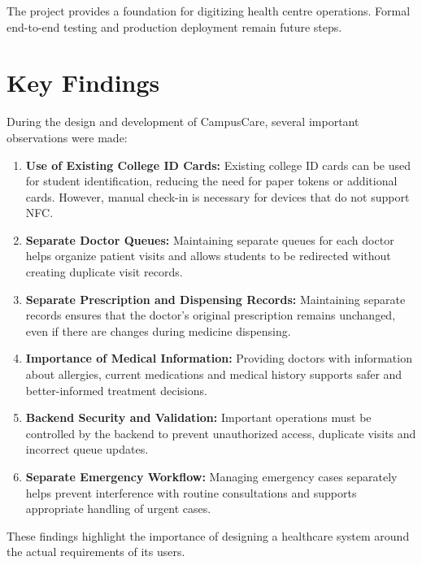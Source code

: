 \documentclass[a4paper,oneside,openany]{tietreport}
\begin{document}
The project provides a foundation for digitizing
health centre operations. Formal end-to-end testing
and production deployment remain future steps.


\section{Key Findings}

During the design and development of CampusCare,
several important observations were made:

\begin{enumerate}

    \item \textbf{Use of Existing College ID Cards:}
    Existing college ID cards can be used for student
    identification, reducing the need for paper tokens
    or additional cards. However, manual check-in is
    necessary for devices that do not support NFC.

    \item \textbf{Separate Doctor Queues:}
    Maintaining separate queues for each doctor
    helps organize patient visits and allows students
    to be redirected without creating duplicate
    visit records.

    \item \textbf{Separate Prescription and
    Dispensing Records:}
    Maintaining separate records ensures that
    the doctor's original prescription remains
    unchanged, even if there are changes during
    medicine dispensing.

    \item \textbf{Importance of Medical Information:}
    Providing doctors with information about allergies,
    current medications and medical history supports
    safer and better-informed treatment decisions.

    \item \textbf{Backend Security and Validation:}
    Important operations must be controlled by the
    backend to prevent unauthorized access, duplicate
    visits and incorrect queue updates.

    \item \textbf{Separate Emergency Workflow:}
    Managing emergency cases separately helps prevent
    interference with routine consultations and
    supports appropriate handling of urgent cases.

\end{enumerate}

These findings highlight the importance of designing
a healthcare system around the actual requirements
of its users.
\end{document}
